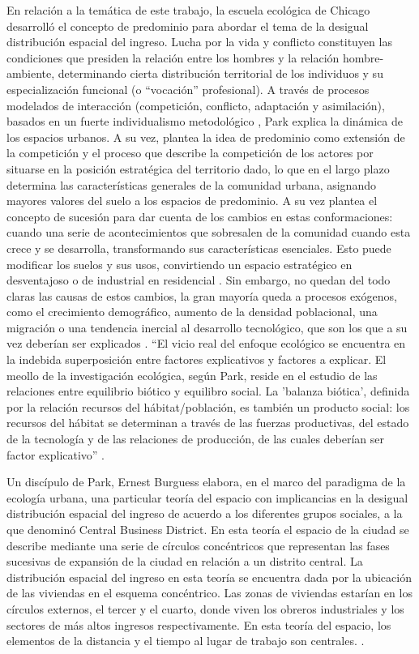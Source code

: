 En relación a la temática de este trabajo, la escuela ecológica de Chicago desarrolló el concepto de predominio para abordar el tema de la desigual distribución espacial del ingreso. Lucha por la vida y conflicto constituyen las condiciones que presiden la relación entre los hombres y la relación hombre-ambiente, determinando cierta distribución territorial de los individuos y su especialización funcional (o “vocación” profesional). A través de procesos modelados de interacción (competición, conflicto, adaptación y asimilación), basados en un fuerte individualismo metodológico \cite{gottdiener}, Park \citeyear{park} explica la dinámica de los espacios urbanos. A su vez, plantea la idea de predominio como extensión de la competición y el proceso que describe la competición de los actores por situarse en la posición estratégica del territorio dado, lo que en el largo plazo determina las características generales de la comunidad urbana, asignando mayores valores del suelo a los espacios de predominio. A su vez plantea el concepto de sucesión para dar cuenta de los cambios en estas conformaciones: cuando una serie de acontecimientos que sobresalen de la comunidad cuando esta crece y se desarrolla, transformando sus características esenciales. Esto puede modificar los suelos y sus usos, convirtiendo un espacio estratégico en desventajoso o de industrial en residencial \cite[p.~78]{betin}. 
Sin embargo, no quedan del todo claras las causas de estos cambios, la gran mayoría queda a procesos exógenos, como el crecimiento demográfico, aumento de la densidad poblacional, una migración o una tendencia inercial al desarrollo tecnológico, que son los que a su vez deberían ser explicados \cite{betin,gottdiener}. “El vicio real del enfoque ecológico se encuentra en la indebida superposición entre factores explicativos y factores a explicar. El meollo de la investigación ecológica, según Park, reside en el estudio de las relaciones entre equilibrio biótico y equilibro social. La 'balanza biótica', definida por la relación recursos del hábitat/población, es también un producto social: los recursos del hábitat se determinan a través de las fuerzas productivas, del estado de la tecnología y de las relaciones de producción, de las cuales deberían ser factor explicativo” \cite[p.~84]{betin}.

Un discípulo de Park, Ernest Burguess \citeyear{burgess1928} elabora, en el marco del paradigma de la ecología urbana, una particular teoría del espacio con implicancias en la desigual distribución espacial del ingreso de acuerdo a los diferentes grupos sociales, a la que denominó Central Business District. En esta teoría el espacio de la ciudad se describe mediante una serie de círculos concéntricos que representan las fases sucesivas de expansión de la ciudad en relación a un distrito central. La distribución espacial del ingreso en esta teoría se encuentra dada por la ubicación de las viviendas en el esquema concéntrico. Las zonas de viviendas estarían en los círculos externos, el tercer y el cuarto, donde viven los obreros industriales y los sectores de más altos ingresos respectivamente. En esta teoría del espacio, los elementos de la distancia y el tiempo al lugar de trabajo son centrales. \cite{burgess1928,betin}. 


